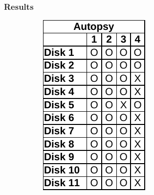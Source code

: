 \subsubsection{Results}
\begin{paraphrase}

\begin{figure}
    \centering

    \begin{subfigure}{0.17\linewidth}
        \includegraphics[width=\linewidth]{fig/autopsy_results_fat.pdf}
    \end{subfigure}~~
    \begin{subfigure}{0.17\linewidth}

\end{subfigure}
\end{figure}
\end{paraphrase}
